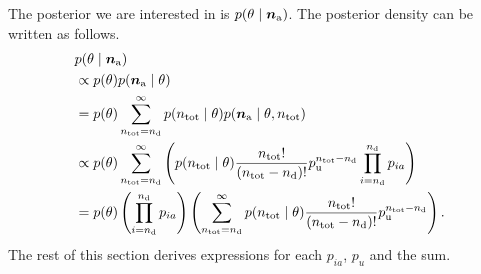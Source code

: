 \documentclass[thesis.tex]{subfiles}
\begin{document}
The posterior we are interested in is $p(\theta \mid \bm{n_\text{a}})$.
The posterior density can be written as follows.
\begin{align}
&p(\theta \mid \bm{n_\text{a}}) \\
&\propto p(\theta) p(\bm{n_\text{a}} \mid \theta) \\
&= p(\theta) \sum_{n_\text{tot}=n_\text{d}}^\infty p(n_\text{tot} \mid \theta) p(\bm{n_\text{a}} \mid \theta, n_\text{tot}) \\
&\propto p(\theta) \sum_{n_\text{tot}=n_\text{d}}^\infty \left( p(n_\text{tot} \mid \theta) \frac{n_\text{tot}!}{(n_\text{tot} - n_\text{d})!} p_\text{u}^{n_\text{tot} - n_\text{d}} \prod_{i=n_\text{d}}^{n_\text{d}} p_{ia} \right) \\
&= p(\theta) \left( \prod_{i=n_\text{d}}^{n_\text{d}} p_{ia} \right) \left( \sum_{n_\text{tot}=n_\text{d}}^\infty p(n_\text{tot} \mid \theta) \frac{n_\text{tot}!}{(n_\text{tot} - n_\text{d})!} p_\text{u}^{n_\text{tot} - n_\text{d}} \right) \label{perf-test:eq:full-posterior}.
\end{align}
The rest of this section derives expressions for each $p_{ia}$, $p_{u}$ and the sum.
\end{document}
